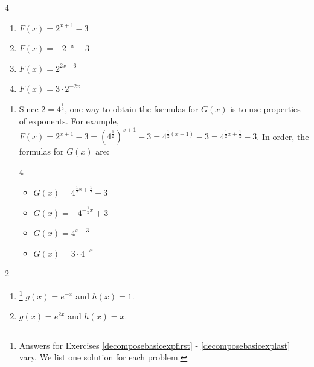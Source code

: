 \documentclass{ximera}
\begin{document}
\begin{multicols}{4}
\begin{enumerate}
\setcounter{enumi}{\value{HW}}

\item $F(x) = 2^{x+1}-3$

\item  $F(x) = -2^{-x} + 3$

\item $F(x) = 2^{2x-6}$

\item  $F(x) =3 \cdot 2^{-2x}$

\setcounter{HW}{\value{enumi}}
\end{enumerate}
\end{multicols}

\begin{enumerate}
\setcounter{enumi}{\value{HW}}

\item  Since $2 = 4^{\frac{1}{2}}$, one way to obtain the formulas for $G(x)$ is to use properties of exponents.  For example, $F(x) = 2^{x+1}-3 = \left(4^{\frac{1}{2}}\right)^{x+1} -3 = 4^{\frac{1}{2}(x+1)} - 3 = 4^{\frac{1}{2} x + \frac{1}{2}} - 3$.  In order, the formulas for $G(x)$ are:

\begin{multicols}{4}
\begin{itemize}

\item $G(x) = 4^{\frac{1}{2}x+\frac{1}{2}}-3$

\item  $G(x) = -4^{-\frac{1}{2} x} + 3$

\item $G(x) = 4^{x-3}$

\item  $G(x) =3 \cdot 4^{-x}$

\end{itemize}
\end{multicols}

\setcounter{HW}{\value{enumi}}
\end{enumerate}

\begin{multicols}{2}

\begin{enumerate}
\setcounter{enumi}{\value{HW}}

\addtocounter{enumi}{1}


\item\footnote{Answers for Exercises \ref{decomposebasicexpfirst} - \ref{decomposebasicexplast} vary.  We list one solution for each problem.} $g(x)  = e^{-x}$ and $h(x) = 1$.
\item $g(x) = e^{2x}$ and $h(x) = x$.


\setcounter{HW}{\value{enumi}}
\end{enumerate}

\end{multicols}
\end{document}

